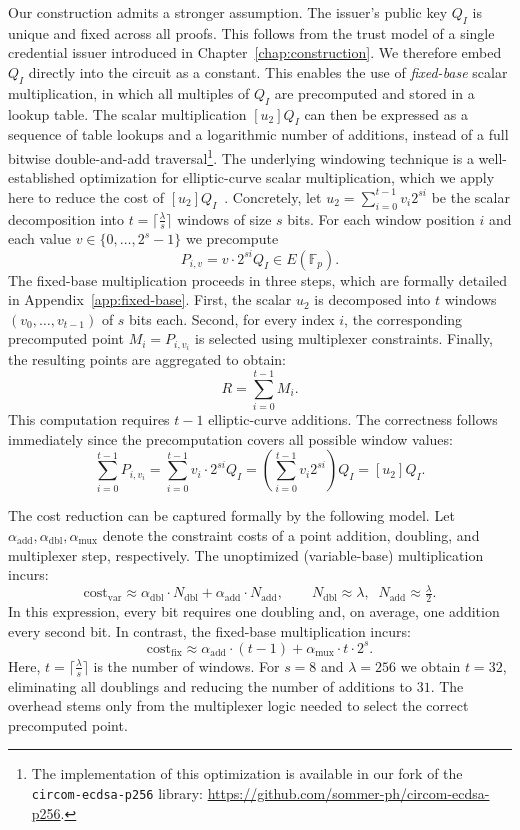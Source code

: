 Our construction admits a stronger assumption. The issuer’s public key $Q_I$ is unique and fixed across all proofs. This follows from the trust model of a single credential issuer introduced in Chapter~\ref{chap:construction}. We therefore embed $Q_I$ directly into the circuit as a constant. This enables the use of \emph{fixed-base} scalar multiplication, in which all multiples of $Q_I$ are precomputed and stored in a lookup table. The scalar multiplication $[u_2]Q_I$ can then be expressed as a sequence of table lookups and a logarithmic number of additions, instead of a full bitwise double-and-add traversal\footnote{The implementation of this optimization is available in our fork of the \texttt{circom-ecdsa-p256} library: \url{https://github.com/sommer-ph/circom-ecdsa-p256}.}. The underlying windowing technique is a well-established optimization for elliptic-curve scalar multiplication, which we apply here to reduce the cost of $[u_2]Q_I$~\cite{boneh2020moderncrypto}. Concretely, let $u_2 = \sum_{i=0}^{t-1} v_i 2^{si}$ be the scalar decomposition into $t=\lceil \frac{\lambda}{s}\rceil$ windows of size $s$ bits. For each window position $i$ and each value $v \in \{0,\dots,2^s-1\}$ we precompute
\[
P_{i,v} = v \cdot 2^{si} Q_I \in E(\mathbb{F}_p).
\]
The fixed-base multiplication proceeds in three steps, which are formally detailed in Appendix~\ref{app:fixed-base}. First, the scalar $u_2$ is decomposed into $t$ windows $(v_0,\dots,v_{t-1})$ of $s$ bits each. Second, for every index $i$, the corresponding precomputed point $M_i = P_{i,v_i}$ is selected using multiplexer constraints. Finally, the resulting points are aggregated to obtain:
\[
R = \sum_{i=0}^{t-1} M_i.
\]
This computation requires $t-1$ elliptic-curve additions. The correctness follows immediately since the precomputation covers all possible window values:
\[
\sum_{i=0}^{t-1} P_{i,v_i}
= \sum_{i=0}^{t-1} v_i \cdot 2^{si} Q_I
= \left(\sum_{i=0}^{t-1} v_i 2^{si}\right) Q_I
= [u_2]Q_I.
\]

\medskip
The cost reduction can be captured formally by the following model.
Let $\alpha_{\mathrm{add}},\alpha_{\mathrm{dbl}},\alpha_{\mathrm{mux}}$ denote the constraint costs of a point addition, doubling, and multiplexer step, respectively. The unoptimized (variable-base) multiplication incurs:
\[
\mathrm{cost}_{\mathrm{var}} \approx \alpha_{\mathrm{dbl}}\cdot N_{\mathrm{dbl}} + \alpha_{\mathrm{add}}\cdot N_{\mathrm{add}},
\qquad
N_{\mathrm{dbl}} \approx \lambda, \;\; N_{\mathrm{add}} \approx \tfrac{\lambda}{2}.
\]
In this expression, every bit requires one doubling and, on average, one addition every second bit. In contrast, the fixed-base multiplication incurs:
\[
\mathrm{cost}_{\mathrm{fix}} \approx \alpha_{\mathrm{add}}\cdot (t-1) + \alpha_{\mathrm{mux}}\cdot t \cdot 2^s.
\]
Here, $t=\lceil \frac{\lambda}{s}\rceil$ is the number of windows. For $s=8$ and $\lambda=256$ we obtain $t=32$, eliminating all doublings and reducing the number of additions to $31$. The overhead stems only from the multiplexer logic needed to select the correct precomputed point.

